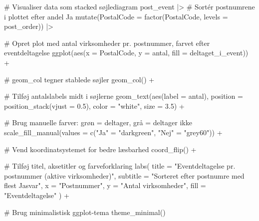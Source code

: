 \documentclass[
  11pt,
  letterpaper,
  DIV=11,
  numbers=noendperiod]{scrartcl}
\newenvironment{Shaded}{\begin{snugshade}}{\end{snugshade}}
\newcommand{\AttributeTok}[1]{\textcolor[rgb]{0.40,0.45,0.13}{#1}}
\newcommand{\CommentTok}[1]{\textcolor[rgb]{0.37,0.37,0.37}{#1}}
\newcommand{\FloatTok}[1]{\textcolor[rgb]{0.68,0.00,0.00}{#1}}
\newcommand{\FunctionTok}[1]{\textcolor[rgb]{0.28,0.35,0.67}{#1}}
\newcommand{\NormalTok}[1]{\textcolor[rgb]{0.00,0.23,0.31}{#1}}
\newcommand{\OtherTok}[1]{\textcolor[rgb]{0.00,0.23,0.31}{#1}}
\newcommand{\SpecialCharTok}[1]{\textcolor[rgb]{0.37,0.37,0.37}{#1}}
\newcommand{\StringTok}[1]{\textcolor[rgb]{0.13,0.47,0.30}{#1}}
\begin{document}
\begin{Shaded}
\begin{Highlighting}[]
\CommentTok{\# Visualiser data som stacked søjlediagram}
\NormalTok{post\_event }\SpecialCharTok{|\textgreater{}} 
  \CommentTok{\# Sortér postnumrene i plottet efter andel \textquotesingle{}Ja\textquotesingle{}}
  \FunctionTok{mutate}\NormalTok{(}\AttributeTok{PostalCode =} \FunctionTok{factor}\NormalTok{(PostalCode, }\AttributeTok{levels =}\NormalTok{ post\_order)) }\SpecialCharTok{|\textgreater{}} 
  
  \CommentTok{\# Opret plot med antal virksomheder pr. postnummer, farvet efter eventdeltagelse}
  \FunctionTok{ggplot}\NormalTok{(}\FunctionTok{aes}\NormalTok{(}\AttributeTok{x =}\NormalTok{ PostalCode, }\AttributeTok{y =}\NormalTok{ antal, }\AttributeTok{fill =}\NormalTok{ deltaget\_i\_event)) }\SpecialCharTok{+}
  
  \CommentTok{\# geom\_col tegner stablede søjler}
  \FunctionTok{geom\_col}\NormalTok{() }\SpecialCharTok{+}
  
  \CommentTok{\# Tilføj antalslabels midt i søjlerne}
  \FunctionTok{geom\_text}\NormalTok{(}\FunctionTok{aes}\NormalTok{(}\AttributeTok{label =}\NormalTok{ antal), }\AttributeTok{position =} \FunctionTok{position\_stack}\NormalTok{(}\AttributeTok{vjust =} \FloatTok{0.5}\NormalTok{), }
            \AttributeTok{color =} \StringTok{"white"}\NormalTok{, }\AttributeTok{size =} \FloatTok{3.5}\NormalTok{) }\SpecialCharTok{+}
  
  \CommentTok{\# Brug manuelle farver: grøn = deltager, grå = deltager ikke}
  \FunctionTok{scale\_fill\_manual}\NormalTok{(}\AttributeTok{values =} \FunctionTok{c}\NormalTok{(}\StringTok{"Ja"} \OtherTok{=} \StringTok{"darkgreen"}\NormalTok{, }\StringTok{"Nej"} \OtherTok{=} \StringTok{"grey60"}\NormalTok{)) }\SpecialCharTok{+}
  
  \CommentTok{\# Vend koordinatsystemet for bedre læsbarhed}
  \FunctionTok{coord\_flip}\NormalTok{() }\SpecialCharTok{+}
  
  \CommentTok{\# Tilføj titel, aksetitler og farveforklaring}
  \FunctionTok{labs}\NormalTok{(}
    \AttributeTok{title =} \StringTok{"Eventdeltagelse pr. postnummer (aktive virksomheder)"}\NormalTok{,}
    \AttributeTok{subtitle =} \StringTok{"Sorteret efter postnumre med flest \textquotesingle{}Ja\textquotesingle{}{-}svar"}\NormalTok{,}
    \AttributeTok{x =} \StringTok{"Postnummer"}\NormalTok{,}
    \AttributeTok{y =} \StringTok{"Antal virksomheder"}\NormalTok{,}
    \AttributeTok{fill =} \StringTok{"Eventdeltagelse"}
\NormalTok{  ) }\SpecialCharTok{+}
  
  \CommentTok{\# Brug minimalistisk ggplot{-}tema}
  \FunctionTok{theme\_minimal}\NormalTok{()}
\end{Highlighting}
\end{Shaded}
\end{document}
